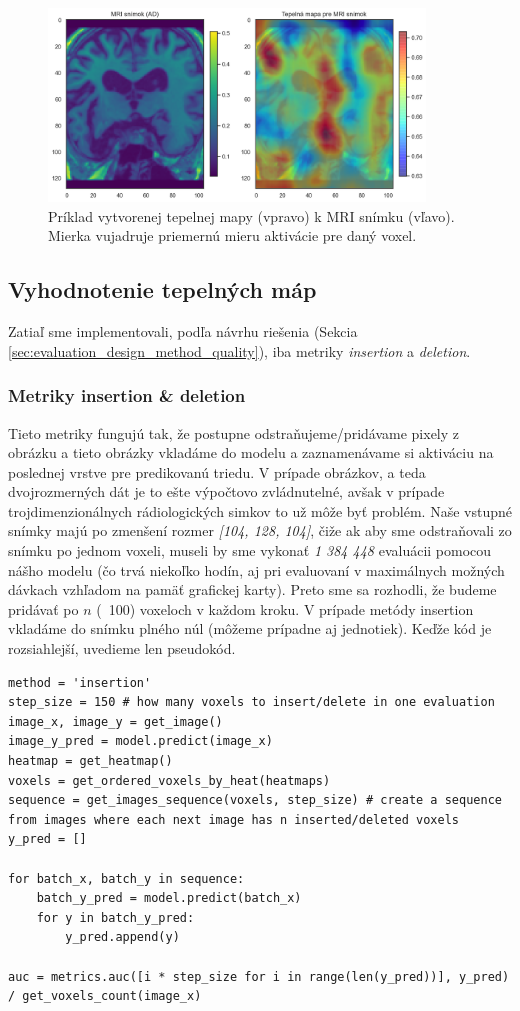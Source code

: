 \begin{figure}[h!]
    \centering
    \includegraphics[width=10cm]{assets/images/heatmap_example.png}
    \caption{Príklad vytvorenej tepelnej mapy (vpravo) k MRI snímku (vľavo). Mierka vujadruje priemernú mieru aktivácie pre daný voxel.}
    \label{fig:heatmap_example}
\end{figure}

\subsection{Vyhodnotenie tepelných máp}

Zatiaľ sme implementovali, podľa návrhu riešenia (Sekcia \ref{sec:evaluation_design_method_quality}), iba metriky \textit{insertion} a \textit{deletion}.

\subsubsection{Metriky insertion \& deletion \label{sec:insertion_deletion}}

Tieto metriky fungujú tak, že postupne odstraňujeme/pridávame pixely z obrázku a tieto obrázky vkladáme do modelu a zaznamenávame si aktiváciu na poslednej vrstve pre predikovanú triedu. V prípade obrázkov, a teda dvojrozmerných dát je to ešte výpočtovo zvládnutelné, avšak v prípade trojdimenzionálnych rádiologických simkov to už môže byť problém. Naše vstupné snímky majú po zmenšení rozmer \textit{[104, 128, 104]}, čiže ak aby sme odstraňovali zo snímku po jednom voxeli, museli by sme vykonať \textit{1 384 448} evaluácii pomocou nášho modelu (čo trvá niekoľko hodín, aj pri evaluovaní v maximálnych možných dávkach vzhľadom na pamäť grafickej karty). Preto sme sa rozhodli, že budeme pridávať po $n$ (~100) voxeloch v každom kroku. V prípade metódy insertion vkladáme do snímku plného núl (môžeme prípadne aj jednotiek). Keďže kód je rozsiahlejší, uvedieme len pseudokód.

\begin{lstlisting}
method = 'insertion'
step_size = 150 # how many voxels to insert/delete in one evaluation
image_x, image_y = get_image()
image_y_pred = model.predict(image_x)
heatmap = get_heatmap()
voxels = get_ordered_voxels_by_heat(heatmaps)
sequence = get_images_sequence(voxels, step_size) # create a sequence from images where each next image has n inserted/deleted voxels
y_pred = []

for batch_x, batch_y in sequence:
    batch_y_pred = model.predict(batch_x)
    for y in batch_y_pred:
        y_pred.append(y)

auc = metrics.auc([i * step_size for i in range(len(y_pred))], y_pred) / get_voxels_count(image_x)
\end{lstlisting}


